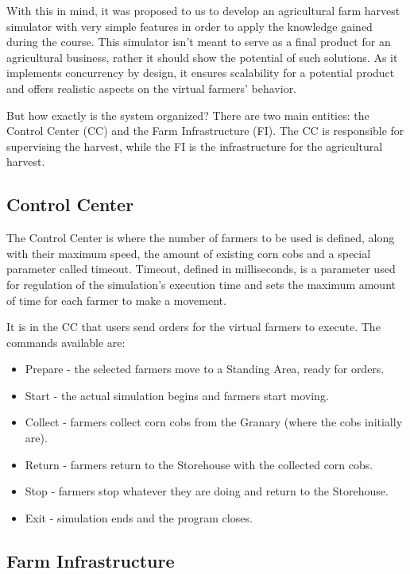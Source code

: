 \documentclass[12pt]{article}
\begin{document}
With this in mind, it was proposed to us to develop an agricultural farm harvest simulator with very simple features in order to apply the knowledge gained 
during the course.
This simulator isn't meant to serve as a final product for an agricultural business, rather it should show the potential of such solutions.
As it implements concurrency by design, it ensures scalability for a potential product and offers realistic aspects on the virtual farmers' behavior.

But how exactly is the system organized?
There are two main entities: the Control Center (CC) and the Farm Infrastructure (FI). 
The CC is responsible for supervising the harvest, while the FI is the infrastructure for the agricultural harvest.

\subsection{Control Center} %

The Control Center is where the number of farmers to be used is defined, along with their maximum speed, the amount of existing corn cobs and a special parameter 
called timeout.
Timeout, defined in milliseconds, is a parameter used for regulation of the simulation's execution time and sets the maximum amount of time for each farmer to 
make a movement.

It is in the CC that users send orders for the virtual farmers to execute.
The commands available are:
\vspace{-10pt}
\begin{itemize}[noitemsep]
  \item Prepare - the selected farmers move to a Standing Area, ready for orders.
  \item Start - the actual simulation begins and farmers start moving.
  \item Collect - farmers collect corn cobs from the Granary (where the cobs initially are).
  \item Return - farmers return to the Storehouse with the collected corn cobs.
  \item Stop - farmers stop whatever they are doing and return to the Storehouse.
  \item Exit - simulation ends and the program closes.
\end{itemize}
\vspace{-10pt}

\subsection{Farm Infrastructure} %
\end{document}
